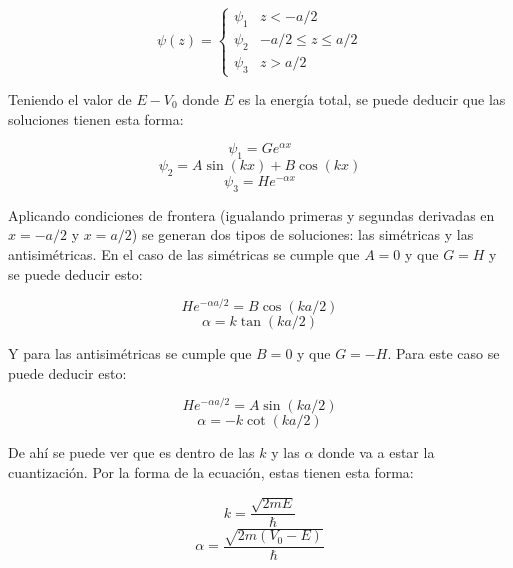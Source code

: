 \documentclass{article}
\begin{document}
\begin{equation}
    \psi(z)= 
    \begin{cases}
       \psi_1 &z< -a/2 \\
       \psi_2 &-a/2\leq z\leq a/2 \\
       \psi_3 &z> a/2
    \end{cases}
\end{equation}

Teniendo el valor de $E-V_0$ donde $E$ es la energía total, se puede deducir que las soluciones tienen esta forma:

\begin{equation}
    \psi_1=Ge^{\alpha x}
\end{equation}
\begin{equation}
    \psi_2=A\sin(kx)+B\cos(kx)
\end{equation}
\begin{equation}
    \psi_3=He^{-\alpha x}
\end{equation}

Aplicando condiciones de frontera (igualando primeras y segundas derivadas en $x=-a/2$ y $x=a/2$) se generan dos tipos de soluciones: las simétricas y las antisimétricas. En el caso de las simétricas se cumple que $A=0$ y que $G=H$ y se puede deducir esto:

\begin{equation}
    He^{-\alpha a/2}=B\cos(ka/2)
\end{equation}
\begin{equation}
    \alpha=k\tan(ka/2)
\end{equation}

Y para las antisimétricas se cumple que $B=0$ y que $G=-H$. Para este caso se puede deducir esto:

\begin{equation}
    He^{-\alpha a/2}=A\sin(ka/2)
\end{equation}
\begin{equation}
    \alpha=-k\cot(ka/2)
\end{equation}

De ahí se puede ver que es dentro de las $k$ y las $\alpha$ donde va a estar la cuantización. Por la forma de la ecuación, estas tienen esta forma:

\begin{equation}
    k=\frac{\sqrt{2mE}}{\hbar}
\end{equation}
\begin{equation}
    \alpha=\frac{\sqrt{2m(V_0-E)}}{\hbar}
\end{equation}
\end{document}
